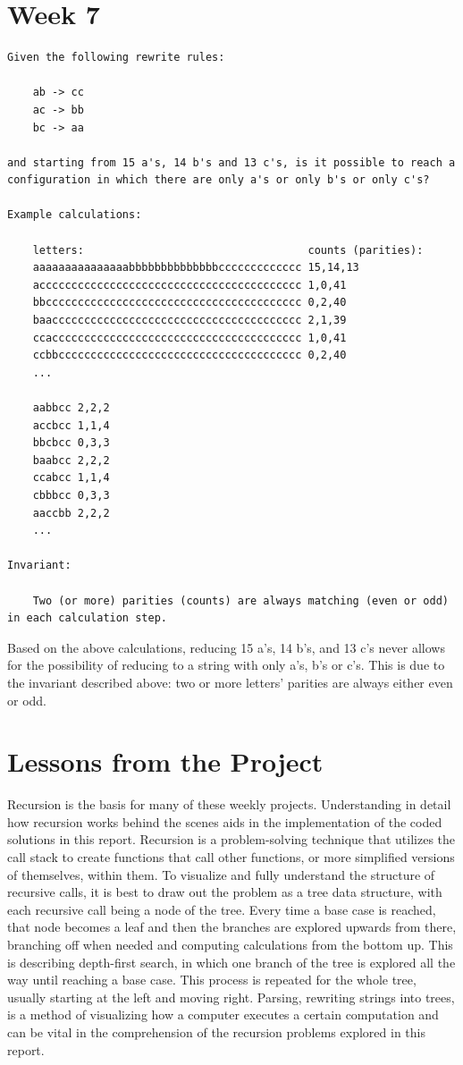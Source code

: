 \documentclass{article}
\theoremstyle{theorem}
\theoremstyle{definition}
\theoremstyle{remark}
\begin{document}
\section{Week 7}

\begin{lstlisting}
Given the following rewrite rules:

    ab -> cc
    ac -> bb
    bc -> aa

and starting from 15 a's, 14 b's and 13 c's, is it possible to reach a configuration in which there are only a's or only b's or only c's?

Example calculations: 

    letters:                                   counts (parities):
    aaaaaaaaaaaaaaabbbbbbbbbbbbbbccccccccccccc 15,14,13
    accccccccccccccccccccccccccccccccccccccccc 1,0,41
    bbcccccccccccccccccccccccccccccccccccccccc 0,2,40
    baaccccccccccccccccccccccccccccccccccccccc 2,1,39
    ccaccccccccccccccccccccccccccccccccccccccc 1,0,41
    ccbbcccccccccccccccccccccccccccccccccccccc 0,2,40
    ...

    aabbcc 2,2,2
    accbcc 1,1,4
    bbcbcc 0,3,3
    baabcc 2,2,2
    ccabcc 1,1,4
    cbbbcc 0,3,3
    aaccbb 2,2,2
    ...

Invariant: 

    Two (or more) parities (counts) are always matching (even or odd) in each calculation step.
\end{lstlisting}

Based on the above calculations, reducing 15 a's, 14 b's, and 13 c's never allows for the possibility of reducing to a string with only a's, b's or c's. This is due to the invariant described above: two or more letters' parities are always either even or odd.

\section{Lessons from the Project}

Recursion is the basis for many of these weekly projects. Understanding in detail how recursion works behind the scenes aids in the implementation of the coded solutions in this report. Recursion is a problem-solving technique that utilizes the call stack to create functions that call other functions, or more simplified versions of themselves, within them. To visualize and fully understand the structure of recursive calls, it is best to draw out the problem as a tree data structure, with each recursive call being a node of the tree. Every time a base case is reached, that node becomes a leaf and then the branches are explored upwards from there, branching off when needed and computing calculations from the bottom up. This is describing depth-first search, in which one branch of the tree is explored all the way until reaching a base case. This process is repeated for the whole tree, usually starting at the left and moving right. Parsing, rewriting strings into trees, is a method of visualizing how a computer executes a certain computation and can be vital in the comprehension of the recursion problems explored in this report. 
\end{document}
